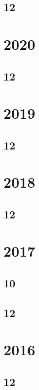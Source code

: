 \subsection{12}

\section{2020} 
\subsection{12} 

\section{2019} 
\subsection{12}





\section{2018} 
\subsection{12}



\section{2017}
\subsection{10}

\subsection{12}


\section{2016}
\subsection{12}



